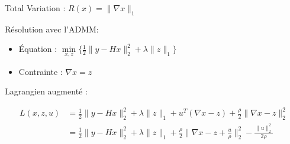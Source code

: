     
\begin{frame}{Total Variation : $R(x) = \lVert \nabla x \rVert_{1}$}

Résolution avec l'ADMM:
\begin{itemize}
    \item Équation : $\min\limits_{x, z} \{ 
        \frac{1}{2} \lVert y - Hx \rVert_{2}^{2} 
        + \lambda \lVert z \rVert_{1} 
    \}$
    \item Contrainte : $\nabla x = z$
\end{itemize}

\vspace{5mm}

Lagrangien augmenté :

\begin{align*}
L(x, z, u) 
&= \frac{1}{2} \lVert y - Hx \rVert_{2}^{2} 
+ \lambda \lVert z \rVert_{1} 
+ u^{T}(\nabla x-z) + \frac{\rho}{2} \lVert \nabla x-z \rVert_{2}^{2} \\
&= \frac{1}{2} \lVert y - Hx \rVert_{2}^{2} 
+ \lambda \lVert z \rVert_{1}
+ \frac{\rho}{2} \lVert \nabla x - z + \frac{u}{\rho} \rVert_{2}^{2} 
- \frac{\lVert u \rVert_{2}^{2}}{2\rho}    
\end{align*}

\end{frame}



